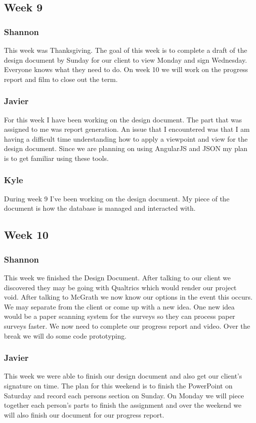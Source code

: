 \documentclass[letterpaper,10pt,serif, draftclsnofoot,onecolumn, compsoc, titlepage]{IEEEtran}
\begin{document}
\subsection{Week 9}
\subsubsection{Shannon}
This week was Thanksgiving. The goal of this week is to complete a draft of the design document by Sunday for our client to view Monday and sign Wednesday. Everyone knows what they need to do. On week 10 we will work on the progress report and film to close out the term.
\subsubsection{Javier}
For this week I have been working on the design document. The part that was assigned to me was report generation. An issue that I encountered was that I am having a difficult time understanding how to apply a viewpoint and view for the design document. Since we are planning on using AngularJS and JSON my plan is to get familiar using these tools.
\subsubsection{Kyle}
During week 9 I've been working on the design document. My piece of the document is how the database is managed and interacted with.
\subsection{Week 10}
\subsubsection{Shannon}
This week we finished the Design Document. After talking to our client we discovered they may be going with Qualtrics which would render our project void. After talking to McGrath we now know our options in the event this occurs. We may separate from the client or come up with a new idea. One new idea would be a paper scanning system for the surveys so they can process paper surveys faster. We now need to complete our progress report and video. Over the break we will do some code prototyping.
\subsubsection{Javier}
This week we were able to finish our design document and also get our client's signature on time. The plan for this weekend is to finish the PowerPoint on Saturday and record each persons section on Sunday. On Monday we will piece together each person's parts to finish the assignment and over the weekend we will also finish our document for our progress report.
\end{document}
